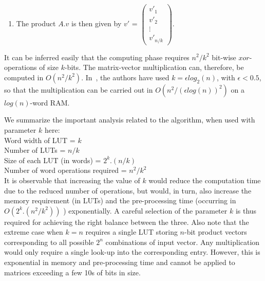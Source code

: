 \documentclass[conference, 9pt]{IEEEtran}
\begin{document}
\begin{enumerate}
	\item The product $A.v$ is then given by $v'$ = $\begin{pmatrix}
    v'_1 \\
    v'_2 \\
    \vdots \\
    v'_{n/k}
\end{pmatrix}$. 
\end{enumerate}

It can be inferred easily that the computing phase requires $n^2/k^2$ bit-wise $xor$-operations of
size $k$-bits. The matrix-vector multiplication can, therefore, be computed in $O(n^2/k^2)$.
In~\cite{williams2007matrix}, the authors have used $k = \epsilon log_2(n)$, with $\epsilon < 0.5$,
so that the multiplication can be carried out in $O(n^2/(\epsilon log(n))^2)$ on a $log(n)$-word
RAM. 

We summarize the important analysis related to the algorithm, when used with parameter $k$ here:\\
Word width of LUT = $k$ \\
Number of LUTs = $n/k$ \\
Size of each LUT (in words) = $2^k.(n/k)$ \\
Number of word operations required = $n^2/k^2$ \\

It is observable that increasing the value of $k$ would reduce the computation time due to the
reduced number of operations, but would, in turn, also increase the memory requirement (in LUTs) and
the pre-processing time (occurring in $O(2^k.(n^2/k^2))$ ) exponentially. A careful selection of the
parameter $k$ is thus required for achieving the right balance between the three. Also note that the
extreme case when $k = n$ requires a single LUT storing $n$-bit product vectors corresponding to all
possible $2^n$ combinations of input vector. Any multiplication would only require a single look-up
into the corresponding entry. However, this is exponential in memory and pre-processing time and
cannot be applied to matrices exceeding a few 10s of bits in size.
\end{document}
